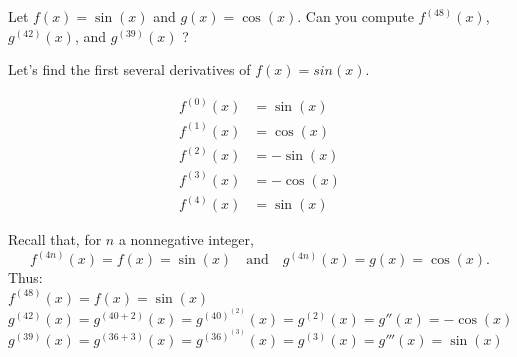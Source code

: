 \documentclass[nooutcomes,handout]{ximera}
\begin{document}
\begin{problem}
Let $f(x) = \sin(x)$ and $g(x) = \cos(x)$.  Can you compute $f^{(48)}(x)$, $g^{(42)}(x)$, and $g^{(39)}(x)$ ?  

\begin{freeResponse}
Let's find the first several derivatives of $f(x)=sin(x)$.

	\begin{align*}
	f^{(0)}(x)&=\sin(x)\\
	f^{(1)}(x)&=\cos(x)\\
	f^{(2)}(x)&=-\sin(x)\\
	f^{(3)}(x)&=-\cos(x)\\
	f^{(4)}(x)&=\sin(x)
	\end{align*}

  Recall that, for $n$ a nonnegative integer,
  $$f^{(4n)}(x) = f(x) = \sin(x) \quad \text{and} \quad g^{(4n)}(x) = g(x) = \cos(x).$$
  Thus: \\ 
  $f^{(48)}(x) =f(x)= \sin(x)$ \\
 $g^{(42)}(x) =g^{(40+2)}(x)=g^{(40)^{(2)}}(x)= g^{(2)}(x) = g''(x) = - \cos(x)$  \\
$g^{(39)}(x) =g^{(36+3)}(x)=g^{(36)^{(3)}}(x)= g^{(3)}(x) = g'''(x) = \sin(x)$  



\end{freeResponse}

\end{problem}
	


		
\end{document}
